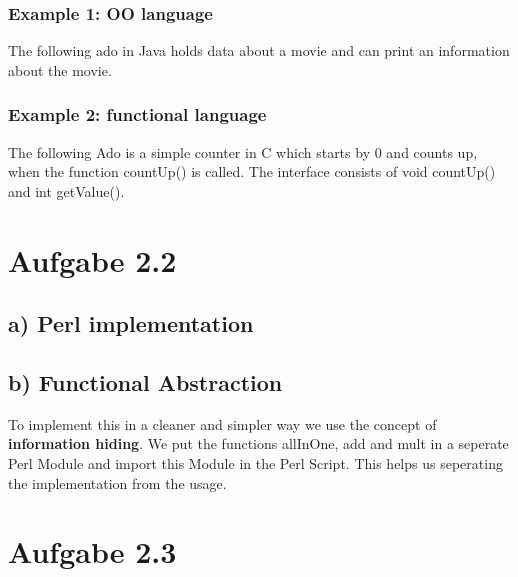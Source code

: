 \documentclass[a4paper,10pt]{scrartcl}[2003/01/01]
\begin{document}
    \subsubsection*{Example 1: OO language}
    The following ado in Java holds data about a movie and can print an information about the movie. 
    
    
    \subsubsection*{Example 2: functional language}
    The following Ado is a simple counter in C which starts by 0 and counts up, when the function countUp() is called. The interface consists of void countUp() and int getValue().
    
    
    
    \section*{Aufgabe 2.2}
    \subsection*{a) Perl implementation}
    
    \subsection*{b) Functional Abstraction}
    To implement this in a cleaner and simpler way we use the concept of \textbf{information hiding}. We put the functions allInOne, add and mult in a seperate Perl Module and import this Module in the Perl Script. This helps us seperating the implementation from the usage.
    
    
    
    
    
    \section*{Aufgabe 2.3}
    
\end{document}
